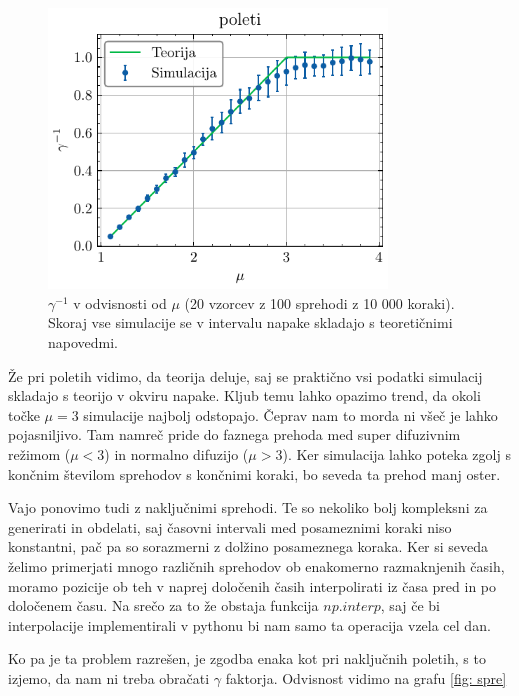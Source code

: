 \documentclass[slovene,11pt,a4paper]{article}
\begin{document}
\begin{figure}[ht]
\begin{center}
  \includegraphics[width=9cm]{graphs/poleti.pdf}
  \caption{$\gamma^{-1}$ v odvisnosti od $\mu$ (20 vzorcev z 100 sprehodi z 10 000 koraki). Skoraj vse simulacije se v intervalu napake skladajo s teoretičnimi napovedmi.}
  \label{fig: poleti}
\end{center}
\end{figure}
\bigskip
Že pri poletih vidimo, da teorija deluje, saj se praktično vsi podatki simulacij skladajo s teorijo v okviru napake. Kljub temu lahko opazimo trend, da okoli točke $\mu = 3$ simulacije najbolj odstopajo. Čeprav nam to morda ni všeč je lahko pojasniljivo. Tam namreč pride do faznega prehoda med super difuzivnim režimom ($\mu < 3$) in normalno difuzijo ($\mu > 3$). Ker simulacija lahko poteka zgolj s končnim številom sprehodov s končnimi koraki, bo seveda ta prehod manj oster.

\bigskip
Vajo ponovimo tudi z naključnimi sprehodi. Te so nekoliko bolj kompleksni za generirati in obdelati, saj časovni intervali med posameznimi koraki niso konstantni, pač pa so sorazmerni z dolžino posameznega koraka. Ker si seveda želimo primerjati mnogo različnih sprehodov ob enakomerno razmaknjenih časih, moramo pozicije ob teh v naprej določenih časih interpolirati iz časa pred in po določenem času. Na srečo za to že obstaja funkcija $np.interp$, saj če bi interpolacije implementirali v pythonu bi nam samo ta operacija vzela cel dan.

Ko pa je ta problem razrešen, je zgodba enaka kot pri naključnih poletih, s to izjemo, da nam ni treba obračati $\gamma$ faktorja. Odvisnost vidimo na grafu \ref{fig: spre}
\end{document}
